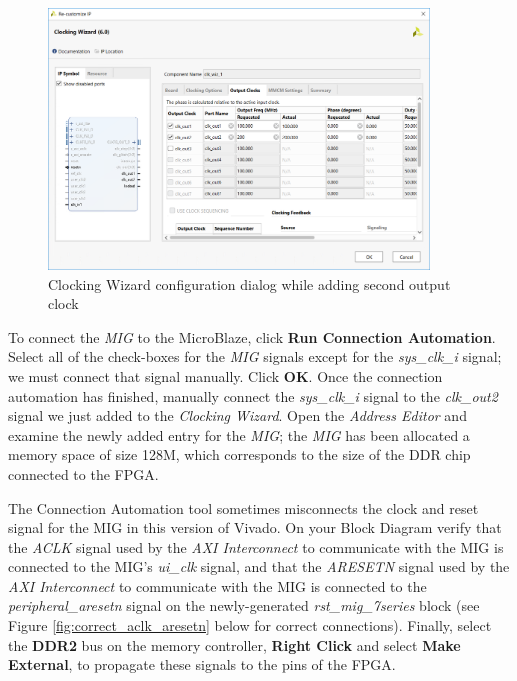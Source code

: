 \documentclass[11pt]{article}
\begin{document}
\begin{figure}[h]
    \centering
    \includegraphics[width=0.9\textwidth]{images/config_clock_wiz2.png}
    \caption{Clocking Wizard configuration dialog while adding second output clock}
    \label{fig:config_clock_wiz2}
\end{figure}

To connect the \textit{MIG} to the MicroBlaze, click \textbf{Run Connection Automation}. Select all of the check-boxes for the \textit{MIG} signals except for the \textit{sys\_clk\_i} signal; we must connect that signal manually. Click \textbf{OK}. Once the connection automation has finished, manually connect the \textit{sys\_clk\_i} signal to the \textit{clk\_out2} signal we just added to the \textit{Clocking Wizard}. Open the \textit{Address Editor} and examine the newly added entry for the \textit{MIG}; the \textit{MIG} has been allocated a memory space of size 128M, which corresponds to the size of the DDR chip connected to the FPGA.

The Connection Automation tool sometimes misconnects the clock and reset signal for the MIG in this version of Vivado. On your Block Diagram verify that the \textit{ACLK} signal used by the \textit{AXI Interconnect} to communicate with the MIG is connected to the MIG's \textit{ui\_clk} signal, and that the \textit{ARESETN} signal used by the \textit{AXI Interconnect} to communicate with the MIG is connected to the \textit{peripheral\_aresetn} signal on the newly-generated \textit{rst\_mig\_7series} block (see Figure \ref{fig:correct_aclk_aresetn} below for correct connections). Finally, select the \textbf{DDR2} bus on the memory controller, \textbf{Right Click} and select \textbf{Make External}, to propagate these signals to the pins of the FPGA.
\end{document}
